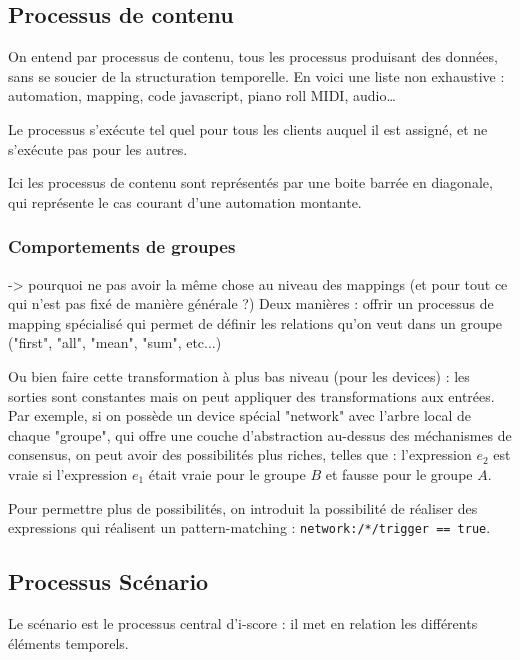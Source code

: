 \documentclass{article}
\begin{document}
\subsection{Processus de contenu}
On entend par processus de contenu, tous les processus produisant des données, sans se soucier de la structuration temporelle. En voici une liste non exhaustive : automation, mapping, code javascript, piano roll MIDI, audio\dots

Le processus s'exécute tel quel pour tous les clients auquel il est assigné, 
et ne s'exécute pas pour les autres.

Ici les processus de contenu sont représentés par une boite barrée en diagonale, qui représente le cas courant d'une automation montante.

\subsubsection{Comportements de groupes}
-> pourquoi ne pas avoir la même chose au niveau des mappings (et pour tout ce qui n'est pas fixé de manière générale ?)
Deux manières : offrir un processus de mapping spécialisé qui permet de définir les relations qu'on veut dans un groupe ("first", "all", "mean", "sum", etc...)

Ou bien faire cette transformation à plus bas niveau (pour les devices) : les sorties sont constantes mais on peut appliquer des transformations aux entrées.
Par exemple, si on possède un device spécial "network" avec l'arbre local de chaque "groupe", qui offre une couche d'abstraction au-dessus des méchanismes de consensus, on peut avoir des possibilités plus riches, telles que : l'expression $e_2$ est vraie si l'expression $e_1$ était vraie pour le groupe $B$ et fausse pour le groupe $A$.

Pour permettre plus de possibilités, on introduit la possibilité de réaliser des expressions qui réalisent un pattern-matching : 
\lstinline|network:/*/trigger == true|.

\subsection{Processus Scénario}
Le scénario est le processus central d'i-score : il met en relation les différents éléments temporels.
\end{document}
